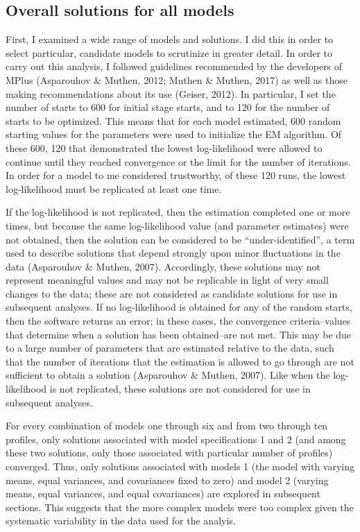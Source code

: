 \documentclass[]{msu-thesis}
\theoremstyle{definition}
\theoremstyle{definition}
\theoremstyle{definition}
\theoremstyle{remark}
\begin{document}
\subsection{Overall solutions for all
models}\label{overall-solutions-for-all-models}

First, I examined a wide range of models and solutions. I did this in
order to select particular, candidate models to scrutinize in greater
detail. In order to carry out this analysis, I followed guidelines
recommended by the developers of MPlus (Asparouhov \& Muthen, 2012;
Muthen \& Muthen, 2017) as well as those making recommendations about
its use (Geiser, 2012). In particular, I set the number of starts to 600
for initial stage starts, and to 120 for the number of starts to be
optimized. This means that for each model estimated, 600 random starting
values for the parameters were used to initialize the EM algorithm. Of
these 600, 120 that demonstrated the lowest log-likelihood were allowed
to continue until they reached convergence or the limit for the number
of iterations. In order for a model to me considered trustworthy, of
these 120 runs, the lowest log-likelihood must be replicated at least
one time.

If the log-likelihood is not replicated, then the estimation completed
one or more times, but because the same log-likelihood value (and
parameter estimates) were not obtained, then the solution can be
considered to be ``under-identified'', a term used to describe solutions
that depend strongly upon minor fluctuations in the data (Asparouhov \&
Muthen, 2007). Accordingly, these solutions may not represent meaningful
values and may not be replicable in light of very small changes to the
data; these are not considered as candidate solutions for use in
subsequent analyses. If no log-likelihood is obtained for any of the
random starts, then the software returns an error; in these cases, the
convergence criteria--values that determine when a solution has been
obtained--are not met. This may be due to a large number of parameters
that are estimated relative to the data, such that the number of
iterations that the estimation is allowed to go through are not
sufficient to obtain a solution (Asparouhov \& Muthen, 2007). Like when
the log-likelihood is not replicated, these solutions are not considered
for use in subsequent analyses.

For every combination of models one through six and from two through ten
profiles, only solutions associated with model specifications 1 and 2
(and among these two solutions, only those associated with particular
number of profiles) converged. Thus, only solutions associated with
models 1 (the model with varying means, equal variances, and covariances
fixed to zero) and model 2 (varying means, equal variances, and equal
covariances) are explored in subsequent sections. This suggests that the
more complex models were too complex given the systematic variability in
the data used for the analyis.
\end{document}
